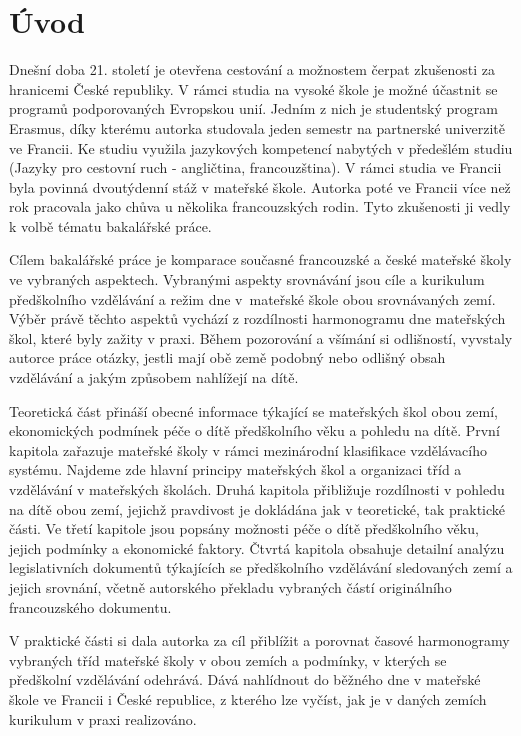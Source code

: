 \setcounter{page}{1}
\chapter*{Úvod}
Dnešní doba 21. století je otevřena cestování a možnostem čerpat zkušenosti za hranicemi České republiky. V rámci studia na vysoké škole je možné účastnit se programů podporovaných Evropskou unií. Jedním z nich je studentský program Erasmus, díky kterému autorka studovala jeden semestr na partnerské univerzitě ve Francii. Ke studiu využila jazykových kompetencí nabytých v předešlém studiu (Jazyky pro cestovní ruch - angličtina, francouzština). V rámci studia ve Francii byla povinná dvoutýdenní stáž v mateřské škole. Autorka poté ve Francii více než rok pracovala jako chůva u několika francouzských rodin. Tyto zkušenosti ji vedly k volbě tématu bakalářské práce. 

Cílem bakalářské práce je komparace současné francouzské a české mateřské školy ve vybraných aspektech. Vybranými aspekty srovnávání jsou cíle a kurikulum předškolního vzdělávání a režim dne v mateřské škole obou srovnávaných zemí. Výběr právě těchto aspektů vychází z rozdílnosti harmonogramu dne mateřských škol, které byly zažity v praxi. Během pozorování a všímání si odlišností, vyvstaly autorce práce otázky, jestli mají obě země podobný nebo odlišný obsah vzdělávání a jakým způsobem nahlížejí na dítě. 

Teoretická část přináší obecné informace týkající se mateřských škol obou zemí, ekonomických podmínek péče o dítě předškolního věku a pohledu na dítě. První kapitola zařazuje mateřské školy v rámci mezinárodní klasifikace vzdělávacího systému. Najdeme zde hlavní principy mateřských škol a organizaci tříd a vzdělávání v mateřských školách. Druhá kapitola přibližuje rozdílnosti v pohledu na dítě obou zemí, jejichž pravdivost je dokládána jak v teoretické, tak praktické části. Ve třetí kapitole jsou popsány možnosti péče o dítě předškolního věku, jejich podmínky a ekonomické faktory. Čtvrtá kapitola obsahuje detailní analýzu legislativních dokumentů týkajících se předškolního vzdělávání sledovaných zemí a jejich srovnání, včetně autorského překladu vybraných částí originálního francouzského dokumentu.

V praktické části si dala autorka za cíl přiblížit a porovnat časové harmonogramy vybraných tříd mateřské školy v obou zemích a podmínky, v kterých se předškolní vzdělávání odehrává. Dává nahlídnout do běžného dne v mateřské škole ve Francii i České republice, z kterého lze vyčíst, jak je v daných zemích kurikulum v praxi realizováno.  